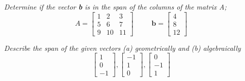 \documentclass[11pt,letterpaper,boxed]{hmcpset}
\begin{document}


\pagebreak
{}

\begin{problem}[2.3.8]
\textit{Determine if the vector \textbf{b} is in the span of the columns of the matrix A;}
$$ A = \begin{bmatrix}
1&2&3\\5&6&7\\9&10&11
\end{bmatrix}
\phantom{asdas}
\textbf{b}= \begin{bmatrix}
4\\8\\12
\end{bmatrix}
$$
\end{problem}



\pagebreak

\begin{problem}[2.3.16]
\textit{Describe the span of the given vectors (a) geometrically  and (b) algebraically}
$$ \begin{bmatrix}
1\\0\\-1
\end{bmatrix} \phantom{	},
\begin{bmatrix}
-1\\1\\0
\end{bmatrix} \phantom{	},
\begin{bmatrix}
0\\-1\\1
\end{bmatrix} \phantom{	}
$$
\end{problem}



\pagebreak
\end{document}
